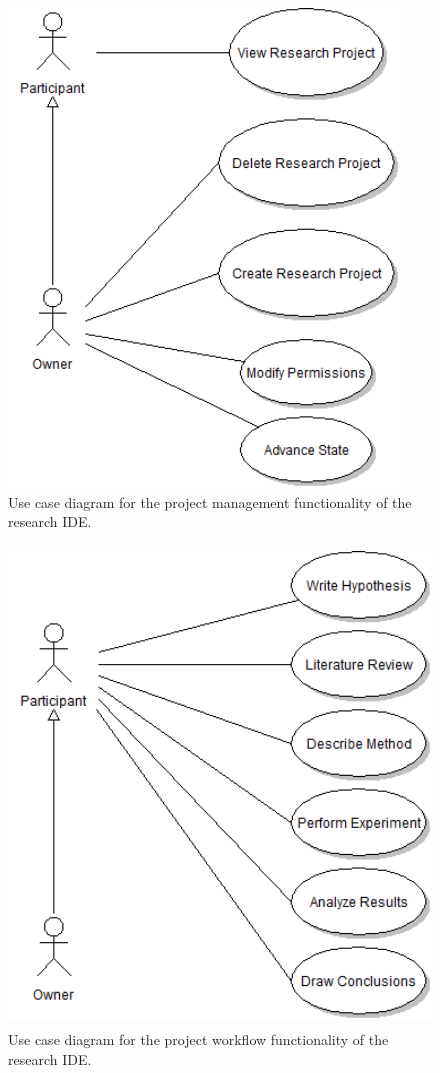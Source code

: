 \begin{figure}[!ht]
\centering \includegraphics[height=5in]{./img/case-study-research-railgun/project_management_use_case}
\caption{Use case diagram for the project management functionality of the research IDE.}
\label{fig:case-research-use-case-project-management}
\end{figure}

\begin{figure}[!ht]
\centering \includegraphics[height=5in]{./img/case-study-research-railgun/project_workflow_use_case}
\caption{Use case diagram for the project workflow functionality of the research IDE.}
\label{fig:case-research-use-case-project-workflow}
\end{figure}

